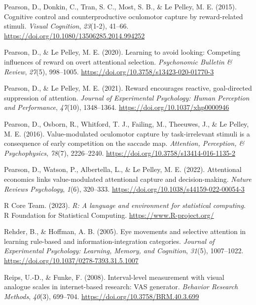 \documentclass[
  man,
  floatsintext,
  longtable,
  nolmodern,
  notxfonts,
  notimes,
  mask,
  colorlinks=true,linkcolor=blue,citecolor=blue,urlcolor=blue]{apa7}
\newlength{\cslhangindent}
\newenvironment{CSLReferences}[2] %
 {\begin{list}{}{%
  \setlength{\itemindent}{0pt}
  \setlength{\leftmargin}{0pt}
  \setlength{\parsep}{0pt}
  \ifodd #1
   \setlength{\leftmargin}{\cslhangindent}
   \setlength{\itemindent}{-1\cslhangindent}
  \fi
  \setlength{\itemsep}{#2\baselineskip}}}
 {\end{list}}
\begin{document}
\begin{CSLReferences}{1}{0}
Pearson, D., Donkin, C., Tran, S. C., Most, S. B., \& Le Pelley, M. E.
(2015). Cognitive control and counterproductive oculomotor capture by
reward-related stimuli. \emph{Visual Cognition}, \emph{23}(1-2), 41--66.
\url{https://doi.org/10.1080/13506285.2014.994252}

Pearson, D., \& Le Pelley, M. E. (2020). Learning to avoid looking:
{Competing} influences of reward on overt attentional selection.
\emph{Psychonomic Bulletin \& Review}, \emph{27}(5), 998--1005.
\url{https://doi.org/10.3758/s13423-020-01770-3}

Pearson, D., \& Le Pelley, M. E. (2021). Reward encourages reactive,
goal-directed suppression of attention. \emph{Journal of Experimental
Psychology: Human Perception and Performance}, \emph{47}(10),
1348--1364. \url{https://doi.org/10.1037/xhp0000946}

Pearson, D., Osborn, R., Whitford, T. J., Failing, M., Theeuwes, J., \&
Le Pelley, M. E. (2016). Value-modulated oculomotor capture by
task-irrelevant stimuli is a consequence of early competition on the
saccade map. \emph{Attention, Perception, \& Psychophysics},
\emph{78}(7), 2226--2240.
\url{https://doi.org/10.3758/s13414-016-1135-2}

Pearson, D., Watson, P., Albertella, L., \& Le Pelley, M. E. (2022).
Attentional economics links value-modulated attentional capture and
decision-making. \emph{Nature Reviews Psychology}, \emph{1}(6),
320--333. \url{https://doi.org/10.1038/s44159-022-00054-3}

R Core Team. (2023). \emph{R: A language and environment for statistical
computing}. R Foundation for Statistical Computing.
\url{https://www.R-project.org/}

Rehder, B., \& Hoffman, A. B. (2005). Eye movements and selective
attention in learning rule-based and information-integration categories.
\emph{Journal of Experimental Psychology: Learning, Memory, and
Cognition}, \emph{31}(5), 1007--1022.
\url{https://doi.org/10.1037/0278-7393.31.5.1007}

Reips, U.-D., \& Funke, F. (2008). Interval-level measurement with
visual analogue scales in internet-based research: VAS generator.
\emph{Behavior Research Methods}, \emph{40}(3), 699--704.
\url{https://doi.org/10.3758/BRM.40.3.699}


\end{CSLReferences}
\end{document}
